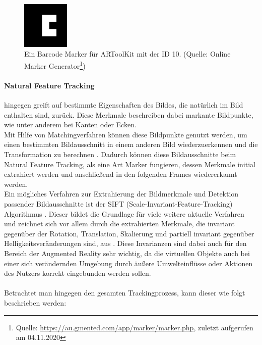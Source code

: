 \begin{figure}[h!]
\centering
\includegraphics[width=0.2\textwidth]{Abbildungen/BarcodeMarker3x3-10.png}
\caption[Augmented Reality: Barcode Marker]{Ein Barcode Marker für ARToolKit mit der ID 10. (Quelle: Online Marker Generator\footnote{Quelle: \url{https://au.gmented.com/app/marker/marker.php},  zuletzt aufgerufen am 04.11.2020})}
\label{fig:barcode-marker}
\end{figure}


\paragraph{Natural Feature Tracking} hingegen greift auf bestimmte Eigenschaften des Bildes, die natürlich im Bild enthalten sind, zurück. Diese Merkmale beschreiben dabei markante Bildpunkte, wie unter anderem bei Kanten oder Ecken. \citep[Kapitel 3.2]{cukovic:marker-vs-natural}\\
Mit Hilfe von Matchingverfahren können diese Bildpunkte genutzt werden, um einen bestimmten Bildausschnitt in einem anderen Bild wiederzuerkennen und die Transformation zu berechnen \citep[S. 341]{nischwitz:bildverarbeitung}.
Dadurch können diese Bildausschnitte beim Natural Feature Tracking, als eine Art Marker fungieren, dessen Merkmale initial extrahiert werden und anschließend in den folgenden Frames wiedererkannt werden.\\
Ein mögliches Verfahren zur Extrahierung der Bildmerkmale und Detektion passender Bildausschnitte ist der SIFT (Scale-Invariant-Feature-Tracking) Algorithmus \citet[Kapitel 3.2]{cukovic:marker-vs-natural}. Dieser bildet die Grundlage für viele weitere aktuelle Verfahren und zeichnet sich vor allem durch die extrahierten Merkmale, die invariant gegenüber der Rotation, Translation, Skalierung und partiell invariant gegenüber Helligkeitsveränderungen sind, aus \citep[S. 345]{nischwitz:bildverarbeitung}. Diese Invarianzen sind dabei auch für den Bereich der Augmented Reality sehr wichtig, da die virtuellen Objekte auch bei einer sich verändernden Umgebung durch äußere Umwelteinflüsse oder Aktionen des Nutzers korrekt eingebunden werden sollen.\\
\\
Betrachtet man hingegen den gesamten Trackingprozess, kann dieser wie folgt beschrieben werden:\\
